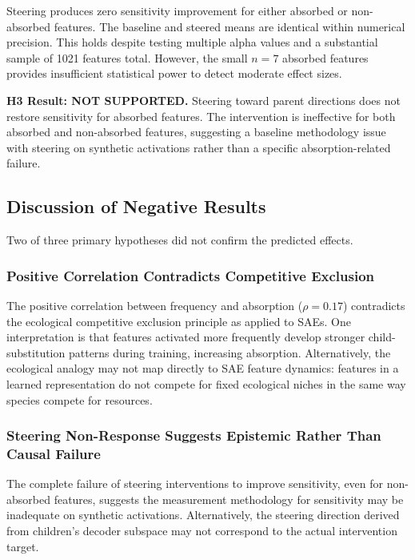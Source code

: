 \documentclass{article}
\begin{document}
Steering produces zero sensitivity improvement for either absorbed or non-absorbed features. The baseline and steered means are identical within numerical precision. This holds despite testing multiple alpha values and a substantial sample of 1021 features total. However, the small $n=7$ absorbed features provides insufficient statistical power to detect moderate effect sizes.

\textbf{H3 Result: NOT SUPPORTED.} Steering toward parent directions does not restore sensitivity for absorbed features. The intervention is ineffective for both absorbed and non-absorbed features, suggesting a baseline methodology issue with steering on synthetic activations rather than a specific absorption-related failure.

\subsection{Discussion of Negative Results}

Two of three primary hypotheses did not confirm the predicted effects.

\subsubsection{Positive Correlation Contradicts Competitive Exclusion}

The positive correlation between frequency and absorption ($\rho = 0.17$) contradicts the ecological competitive exclusion principle as applied to SAEs. One interpretation is that features activated more frequently develop stronger child-substitution patterns during training, increasing absorption. Alternatively, the ecological analogy may not map directly to SAE feature dynamics: features in a learned representation do not compete for fixed ecological niches in the same way species compete for resources.

\subsubsection{Steering Non-Response Suggests Epistemic Rather Than Causal Failure}

The complete failure of steering interventions to improve sensitivity, even for non-absorbed features, suggests the measurement methodology for sensitivity may be inadequate on synthetic activations. Alternatively, the steering direction derived from children's decoder subspace may not correspond to the actual intervention target.
\end{document}
